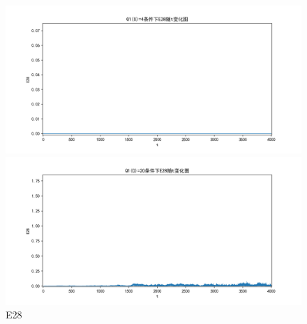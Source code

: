 \documentclass[10pt, a4paper]{article}
\begin{document}
    \begin{figure}[H]
        \begin{minipage}[t]{0.49\textwidth}
            \centering
            \includegraphics[width=\textwidth]{./q5_pics/cmp/E28.png}
        \end{minipage}
        \begin{minipage}[t]{0.49\textwidth}
            \centering
            \includegraphics[width=\textwidth]{./q5_pics/exp/E28.png}
        \end{minipage}
        \caption{E28}\label{fig:E28 in q5}
    \end{figure}
\end{document}
